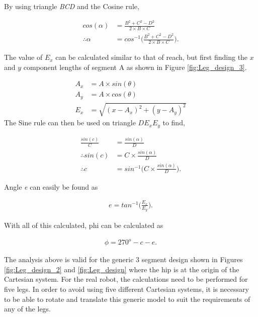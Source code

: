 By using triangle \textit{BCD} and the Cosine rule,

\begin{align}
cos(\alpha) &= \frac{B^2+C^2-D^2}{2\times B\times C}\\
\therefore \alpha &= cos^{-1}\Bigg(\frac{B^2+C^2-D^2}{2\times B\times C}\Bigg).
\end{align}

The value of $E_x$ can be calculated similar to that of reach, but first finding the $x$ and $y$ component lengths of segment A as shown in Figure \ref{fig:Leg_design_3}.

\begin{align}
A_x &= A \times sin(\theta)\\
A_y &= A \times cos(\theta)\\
E_x &= \sqrt{(x-A_x)^2+(y-A_y)^2}
\end{align}
The Sine rule can then be used on triangle $DE_xE_y$ to find,

\begin{align}
\frac{sin(c)}{C} &= \frac{sin(\alpha)}{D}\\
\therefore sin(c) &= C \times \frac{sin(\alpha)}{D}\\
\therefore c &= sin^{-1}\Bigg(C \times \frac{sin(\alpha)}{D}\Bigg).
\end{align}

Angle \textit{e} can easily be found as

\begin{align}
e = tan^{-1}\Bigg(\frac{E_x}{E_y}\Bigg).
\end{align}

With all of this calculated, phi can be calculated as

\begin{align}
\label{eq:IKend}
\phi = 270^o - c -e.
\end{align}

The analysis above is valid for the generic 3 segment design shown in Figures \ref{fig:Leg_design_2} and \ref{fig:Leg_design} where the hip is at the origin of the Cartesian system. For the real robot, the calculations need to be performed for five legs. In order to avoid using five different Cartesian systems, it is necessary to be able to rotate and translate this generic model to suit the requirements of any of the legs.\\

